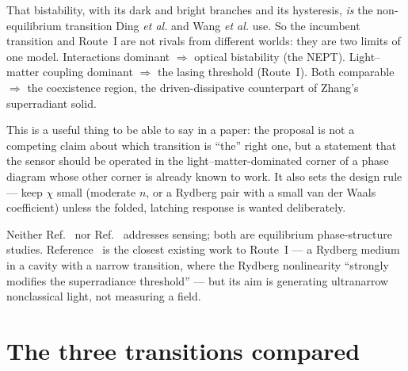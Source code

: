 \documentclass[11pt,a4paper]{article}
\begin{document}
That bistability, with its dark and bright branches and its hysteresis, \emph{is} the
non-equilibrium transition Ding \emph{et al.} and Wang \emph{et al.} use. So the incumbent
transition and Route~I are not rivals from different worlds: they are two limits of one model.
Interactions dominant $\Rightarrow$ optical bistability (the NEPT). Light--matter coupling
dominant $\Rightarrow$ the lasing threshold (Route~I). Both comparable $\Rightarrow$ the
coexistence region, the driven-dissipative counterpart of Zhang's superradiant solid.

This is a useful thing to be able to say in a paper: the proposal is not a competing claim
about which transition is ``the'' right one, but a statement that the sensor should be operated
in the light--matter-dominated corner of a phase diagram whose other corner is already known to
work. It also sets the design rule --- keep $\chi$ small (moderate $n$, or a Rydberg pair with a
small van der Waals coefficient) unless the folded, latching response is wanted deliberately.

Neither Ref.~\cite{Zhang2013} nor Ref.~\cite{DickeIsing2025} addresses sensing; both are
equilibrium phase-structure studies. Reference~\cite{SteadySR2016} is the closest existing work
to Route~I --- a Rydberg medium in a cavity with a narrow transition, where the Rydberg
nonlinearity ``strongly modifies the superradiance threshold'' --- but its aim is generating
ultranarrow nonclassical light, not measuring a field.

\section{The three transitions compared}
\label{sec:compare}
\end{document}
